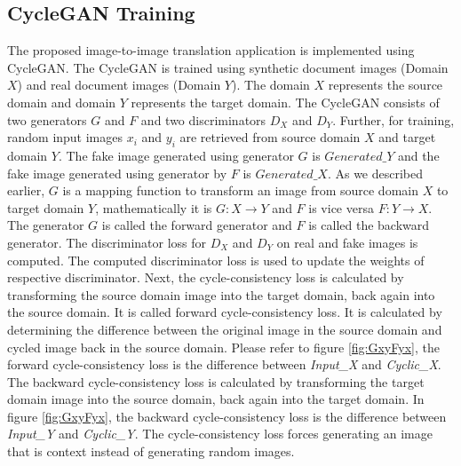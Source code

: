 \subsection{\ac{CycleGAN} Training}







The proposed image-to-image translation application is implemented using \ac{CycleGAN}. The \ac{CycleGAN} is trained using synthetic document images (Domain $X$) and real document images (Domain $Y$). The domain $X$ represents the source domain and domain $Y$ represents the target domain. The \ac{CycleGAN} consists of two generators $G$ and $F$ and two discriminators $D_X$ and $D_Y$. Further, for training, random input images $x_i$ and $y_i$ are retrieved from source domain $X$ and target domain $Y$. The fake image generated using generator $G$ is $Generated\_Y$ and the fake image generated using generator by $F$ is $Generated\_X$. As we described earlier, $G$ is a mapping function to transform an image from source domain $X$ to target domain $Y$, mathematically it is $G: X \rightarrow Y$ and $F$ is vice versa $F: Y \rightarrow X$. The generator $G$ is called the forward generator and $F$ is called the backward generator. The discriminator loss for $D_X$ and $D_Y$ on real and fake images is computed. The computed discriminator loss is used to update the weights of respective discriminator. Next, the cycle-consistency loss is calculated by transforming the source domain image into the target domain, back again into the source domain. It is called forward cycle-consistency loss. It is calculated by determining the difference between the original image in the source domain and cycled image back in the source domain. Please refer to figure \ref{fig:GxyFyx}, the forward cycle-consistency loss is the difference between \textit{Input\_X} and \textit{Cyclic\_X}. The backward cycle-consistency loss is calculated by transforming the target domain image into the source domain, back again into the target domain. In figure \ref{fig:GxyFyx}, the backward cycle-consistency loss is the difference between \textit{Input\_Y} and \textit{Cyclic\_Y}. The cycle-consistency loss forces generating an image that is context instead of generating random images.


